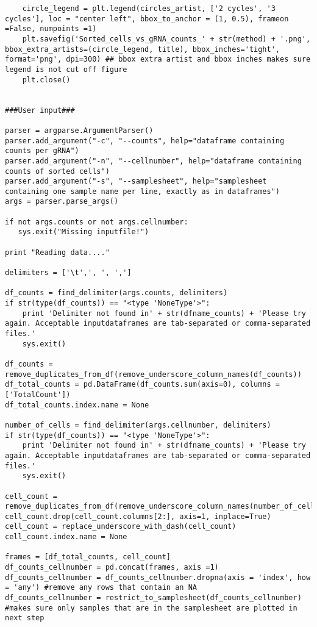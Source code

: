 \begin{footnotesize}
\begin{lstlisting}
    circle_legend = plt.legend(circles_artist, ['2 cycles', '3 cycles'], loc = "center left", bbox_to_anchor = (1, 0.5), frameon =False, numpoints =1)
    plt.savefig('Sorted_cells_vs_gRNA_counts_' + str(method) + '.png', bbox_extra_artists=(circle_legend, title), bbox_inches='tight', format='png', dpi=300) ## bbox extra artist and bbox inches makes sure legend is not cut off figure
    plt.close()


###User input###

parser = argparse.ArgumentParser()
parser.add_argument("-c", "--counts", help="dataframe containing counts per gRNA")
parser.add_argument("-n", "--cellnumber", help="dataframe containing counts of sorted cells")
parser.add_argument("-s", "--samplesheet", help="samplesheet containing one sample name per line, exactly as in dataframes")
args = parser.parse_args()

if not args.counts or not args.cellnumber:
   sys.exit("Missing inputfile!")

print "Reading data...."

delimiters = ['\t',', ', ',']

df_counts = find_delimiter(args.counts, delimiters)
if str(type(df_counts)) == "<type 'NoneType'>":
    print 'Delimiter not found in' + str(dfname_counts) + 'Please try again. Acceptable inputdataframes are tab-separated or comma-separated files.'
    sys.exit()

df_counts = remove_duplicates_from_df(remove_underscore_column_names(df_counts))
df_total_counts = pd.DataFrame(df_counts.sum(axis=0), columns = ['TotalCount'])
df_total_counts.index.name = None

number_of_cells = find_delimiter(args.cellnumber, delimiters)
if str(type(df_counts)) == "<type 'NoneType'>":
    print 'Delimiter not found in' + str(dfname_counts) + 'Please try again. Acceptable inputdataframes are tab-separated or comma-separated files.'
    sys.exit()

cell_count = remove_duplicates_from_df(remove_underscore_column_names(number_of_cells))
cell_count.drop(cell_count.columns[2:], axis=1, inplace=True)
cell_count = replace_underscore_with_dash(cell_count)
cell_count.index.name = None

frames = [df_total_counts, cell_count]
df_counts_cellnumber = pd.concat(frames, axis =1)
df_counts_cellnumber = df_counts_cellnumber.dropna(axis = 'index', how = 'any') #remove any rows that contain an NA
df_counts_cellnumber = restrict_to_samplesheet(df_counts_cellnumber) #makes sure only samples that are in the samplesheet are plotted in next step


\end{lstlisting}
\end{footnotesize}
